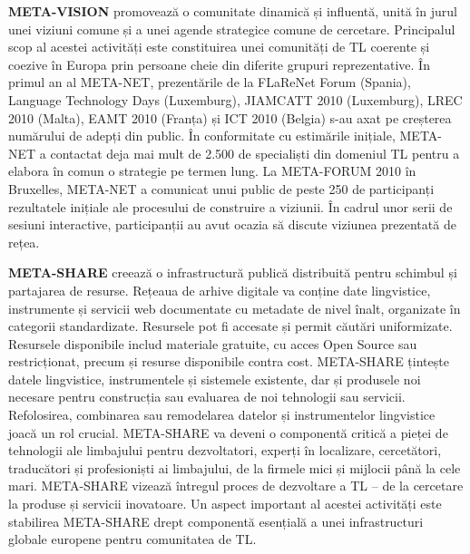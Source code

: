 \begin{multicols}{2}
\textbf{META-VISION} promovează o comunitate dinamică și influentă, unită în jurul unei viziuni comune și a unei agende strategice comune de cercetare. Principalul scop al acestei activități este constituirea unei comunități de TL coerente și coezive în Europa prin persoane cheie din diferite grupuri reprezentative. În primul an al META-NET, prezentările de la FLaReNet Forum (Spania), Language Technology Days (Luxemburg), JIAMCATT 2010 (Luxemburg), LREC 2010 (Malta), EAMT 2010 (Franța) și ICT 2010 (Belgia) s-au axat pe creșterea numărului de adepți din public. În conformitate cu estimările inițiale, META-NET a contactat deja mai mult de 2.500 de specialiști din domeniul TL pentru a elabora în comun o strategie pe termen lung. La META-FORUM 2010 în Bruxelles, META-NET a comunicat unui public de peste 250 de participanți rezultatele inițiale ale procesului de construire a viziunii. În cadrul unor serii de sesiuni interactive, participanții au avut ocazia să discute viziunea prezentată de rețea.

\textbf{META-SHARE} creează o infrastructură publică distribuită pentru schimbul și partajarea de resurse. Rețeaua de arhive digitale va conține date lingvistice, instrumente și servicii web documentate cu metadate de nivel înalt, organizate în categorii standardizate. Resursele pot fi accesate și permit căutări uniformizate. Resursele disponibile includ materiale gratuite, cu acces Open Source sau restricționat, precum și resurse disponibile contra cost. META-SHARE țintește datele lingvistice, instrumentele și sistemele existente, dar și produsele noi necesare pentru construcția sau evaluarea de noi tehnologii sau servicii. Refolosirea, combinarea sau remodelarea datelor și instrumentelor lingvistice joacă un rol crucial. META-SHARE va deveni o componentă critică a pieței de tehnologii ale limbajului pentru dezvoltatori, experți în localizare, cercetători, traducători și profesioniști ai limbajului, de la firmele mici și mijlocii până la cele mari. META-SHARE vizează întregul proces de dezvoltare a TL – de la cercetare la produse și servicii inovatoare. Un aspect important al acestei activități este stabilirea META-SHARE drept componentă esențială a unei infrastructuri globale europene pentru comunitatea de TL. 


\end{multicols}
